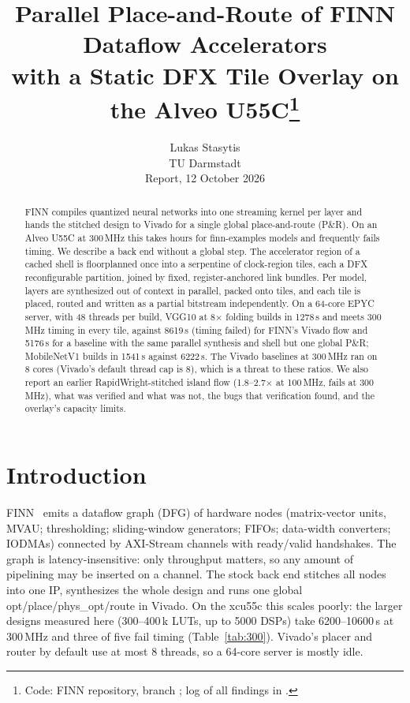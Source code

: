 \documentclass[10pt,twocolumn]{article}
\title{\LARGE Parallel Place-and-Route of FINN Dataflow Accelerators\\[2pt]
\LARGE with a Static DFX Tile Overlay on the Alveo U55C\thanks{Code: FINN repository, branch \code{feature/rwislands}; log of all findings in \code{experiments/dynarapid/NOTES\_ISLANDS.md}.}}
\author{Lukas Stasytis\\TU Darmstadt\\[1pt]{\small Report, 12 October 2026}}
\date{}
\begin{document}
\maketitle

\begin{abstract}
\noindent
FINN compiles quantized neural networks into one streaming kernel per layer and hands the
stitched design to Vivado for a single global place-and-route (P\&R). On an Alveo U55C at
300\,MHz this takes hours for finn-examples models and frequently fails timing. We describe a
back end without a global step. The accelerator region of a cached shell is floorplanned once
into a serpentine of clock-region tiles, each a DFX reconfigurable partition, joined by fixed,
register-anchored link bundles. Per model, layers are synthesized out of context in parallel,
packed onto tiles, and each tile is placed, routed and written as a partial bitstream
independently. On a 64-core EPYC server, with 48 threads per build, VGG10 at 8$\times$ folding
builds in 1278\,s and meets 300\,MHz timing in every tile, against 8619\,s (timing failed) for
FINN's Vivado flow and 5176\,s for a baseline with the same parallel synthesis and shell but
one global P\&R; MobileNetV1 builds in 1541\,s against 6222\,s. The Vivado baselines at
300\,MHz ran on 8 cores (Vivado's default thread cap is 8), which is a threat to these ratios.
We also report an earlier RapidWright-stitched island flow (1.8--2.7$\times$ at 100\,MHz, fails
at 300\,MHz), what was verified and what was not, the bugs that verification found, and the
overlay's capacity limits.
\end{abstract}

\section{Introduction}
FINN~\cite{finn} emits a dataflow graph (DFG) of hardware nodes (matrix-vector units, MVAU;
thresholding; sliding-window generators; FIFOs; data-width converters; IODMAs) connected by
AXI-Stream channels with ready/valid handshakes. The graph is latency-insensitive: only
throughput matters, so any amount of pipelining may be inserted on a channel. The stock back
end stitches all nodes into one IP, synthesizes the whole design and runs one global
opt/place/phys\_opt/route in Vivado. On the xcu55c this scales poorly: the larger designs
measured here (300--400\,k LUTs, up to 5000 DSPs) take 6200--10600\,s at 300\,MHz and three of five fail
timing (Table~\ref{tab:300}). Vivado's placer and router by default use at most 8 threads, so
a 64-core server is mostly idle.
\end{document}
